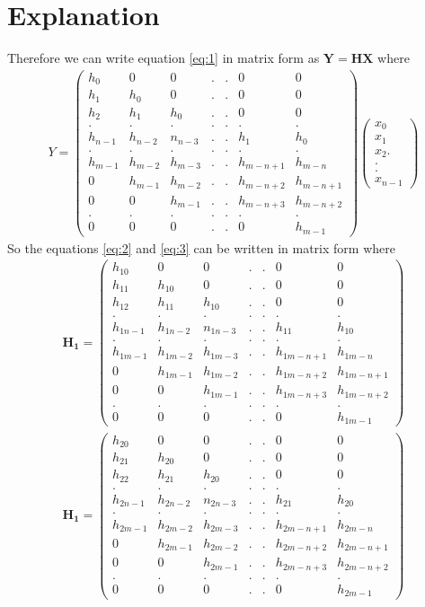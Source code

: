 \documentclass[journal,12pt,twocolumn]{IEEEtran}
\newcommand{\myvec}[1]{\ensuremath{\begin{pmatrix}#1\end{pmatrix}}}
\numberwithin{equation}{subsection}
\let\vec\mathbf
\begin{document}
\section{Explanation}
Therefore we can write equation \eqref{eq:1} in matrix form as $\vec{Y}=\vec{H}\vec{X}$ where
\begin{align}
    Y=\myvec{h_0&0&0&.&.&0&0\\h_1&h_0&0&.&.&0&0\\h_2&h_1&h_0&.&.&0&0\\.&.&.&.&.&.&.\\h_{n-1}&h_{n-2}&n_{n-3}&.&.&h_1&h_0\\.&.&.&.&.&.&.\\h_{m-1}&h_{m-2}&h_{m-3}&.&.&h_{m-n+1}&h_{m-n}\\0&h_{m-1}&h_{m-2}&.&.&h_{m-n+2}&h_{m-n+1}\\0&0&h_{m-1}&.&.&h_{m-n+3}&h_{m-n+2}\\.&.&.&.&.&.&.\\0&0&0&.&.&0&h_{m-1}}\myvec{x_0\\x_1\\x_2.\\.\\.\\x_{n-1}}
\end{align}
So the equations \eqref{eq:2} and \eqref{eq:3} can be written in matrix form where
\begin{align}
    \vec{H_1}=\myvec{h_{10}&0&0&.&.&0&0\\h_{11}&h_{10}&0&.&.&0&0\\h_{12}&h_{11}&h_{10}&.&.&0&0\\.&.&.&.&.&.&.\\h_{1n-1}&h_{1n-2}&n_{1n-3}&.&.&h_{11}&h_{10}\\.&.&.&.&.&.&.\\h_{1m-1}&h_{1m-2}&h_{1m-3}&.&.&h_{1m-n+1}&h_{1m-n}\\0&h_{1m-1}&h_{1m-2}&.&.&h_{1m-n+2}&h_{1m-n+1}\\0&0&h_{1m-1}&.&.&h_{1m-n+3}&h_{1m-n+2}\\.&.&.&.&.&.&.\\0&0&0&.&.&0&h_{1m-1}}\\
    \vec{H_1}=\myvec{h_{20}&0&0&.&.&0&0\\h_{21}&h_{20}&0&.&.&0&0\\h_{22}&h_{21}&h_{20}&.&.&0&0\\.&.&.&.&.&.&.\\h_{2n-1}&h_{2n-2}&n_{2n-3}&.&.&h_{21}&h_{20}\\.&.&.&.&.&.&.\\h_{2m-1}&h_{2m-2}&h_{2m-3}&.&.&h_{2m-n+1}&h_{2m-n}\\0&h_{2m-1}&h_{2m-2}&.&.&h_{2m-n+2}&h_{2m-n+1}\\0&0&h_{2m-1}&.&.&h_{2m-n+3}&h_{2m-n+2}\\.&.&.&.&.&.&.\\0&0&0&.&.&0&h_{2m-1}}
\end{align}
\end{document}
